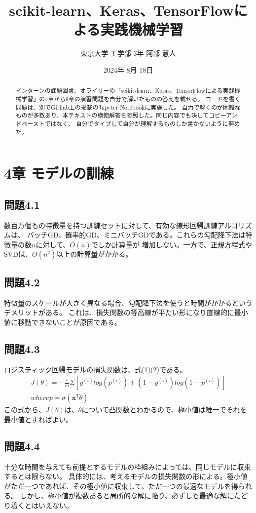 \documentclass[a4j,twocolumn]{jsarticle}
\title{scikit-learn、Keras、TensorFlowによる実践機械学習}
\author{東京大学 工学部 3年 阿部 慧人}
\date{2024年 8月 18日}
\begin{document}
\begin{abstract}
インターンの課題図書、オライリーの「scikit-learn、Keras、TensorFlowによる実践機械学習」の4章から9章の演習問題を自分で解いたものの答えを載せる。
コードを書く問題は、別でGithub上の掲載のJupyter Notebookに実施した。
自力で解くのが困難なものが多数あり、本テキストの模範解答を参照した。同じ内容でも決してコピーアンドペーストではなく、
自分でタイプして自分が理解するものしか書かないように努めた。
\end{abstract}

\maketitle
\section{4章 モデルの訓練}
\subsection{問題4.1}
数百万個もの特徴量を持つ訓練セットに対して、有効な線形回帰訓練アルゴリズムは、
バッチGD、確率的GD、ミニバッチGDである。これらの勾配降下法は特徴量の数$n$に対して、$O(n)$でしか計算量が
増加しない。一方で、正規方程式やSVDは、$O(n^{2})$以上の計算量がかかる。
\subsection{問題4.2}
特徴量のスケールが大きく異なる場合、勾配降下法を使うと時間がかかるというデメリットがある。
これは、損失関数の等高線が平たい形になり直線的に最小値に移動できないことが原因である。

\subsection{問題4.3}
ロジスティック回帰モデルの損失関数は、式(1)(2)である。
\begin{gather}
    J(\theta) = -\frac{1}{m}\Sigma[y^{(i)}log(p^{(i)}) + (1-y^{(i)})log(1-p^{(i)})] \\
    where  p = \sigma(\bm{x}^{T}\theta)
\end{gather}
この式から、$J(\theta)$は、$\theta$について凸関数とわかるので、極小値は唯一でそれを最小値とすればよい。

\subsection{問題4.4}
十分な時間を与えても前提とするモデルの枠組みによっては、同じモデルに収束するとは限らない。
具体的には、考えるモデルの損失関数の形による。極小値がただ一つであれば、その極小値に収束して、ただ一つの最適なモデルを得られる。
しかし、極小値が複数あると局所的な解に陥り、必ずしも最適な解にたどり着くとはいえない。
\end{document}
